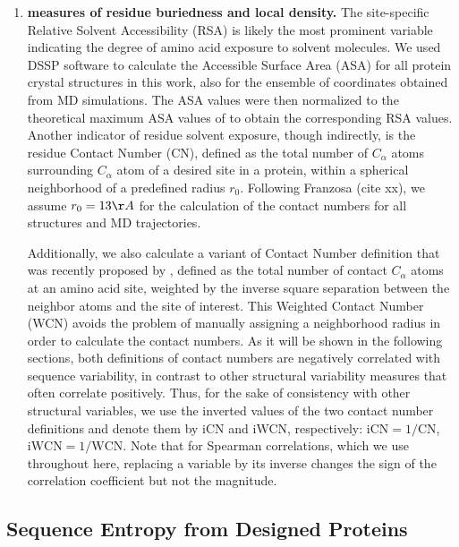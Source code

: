 \documentclass[12pt]{article}
\begin{document}
\begin{enumerate}
            \item {\bf measures of residue buriedness and local density.}
                The site-specific Relative Solvent Accessibility (RSA) is likely the most prominent variable indicating the degree of amino acid exposure to solvent molecules. We used DSSP software \citep{KabschSander1983} to calculate the Accessible Surface Area (ASA) for all protein crystal structures in this work, also for the ensemble of coordinates obtained from MD simulations. The ASA values were then normalized to the theoretical maximum ASA values of \citet{Tienetal2013} to obtain the corresponding RSA values. Another indicator of residue solvent exposure, though indirectly, is the residue Contact Number (CN), defined as the total number of $C_\alpha$ atoms surrounding $C_\alpha$ atom of a desired site in a protein, within a spherical neighborhood of a predefined radius $r_0$. Following Franzosa (cite xx), we assume $r_0=13\AA$ for the calculation of the contact numbers for all structures and MD trajectories.

                Additionally, we also calculate a variant of Contact Number definition that was recently proposed by \citet{Shihetal2012}, defined as the total number of contact $C_\alpha$ atoms at an amino acid site, weighted by the inverse square separation between the neighbor atoms and the site of interest. This Weighted Contact Number (WCN) avoids the problem of manually assigning a neighborhood radius in order to calculate the contact numbers. As it will be shown in the following sections, both definitions of contact numbers are negatively correlated with sequence variability, in contrast to other structural variability measures that often correlate positively. Thus, for the sake of consistency with other structural variables, we use the inverted values of the two contact number definitions and denote them by iCN and iWCN, respectively: $\text{iCN}=1/\text{CN}$, $\text{iWCN}=1/\text{WCN}$. Note that for Spearman correlations, which we use throughout here, replacing a variable by its inverse changes the sign of the correlation coefficient but not the magnitude.

        \end{enumerate}

\subsection*{Sequence Entropy from Designed Proteins}
\end{document}

